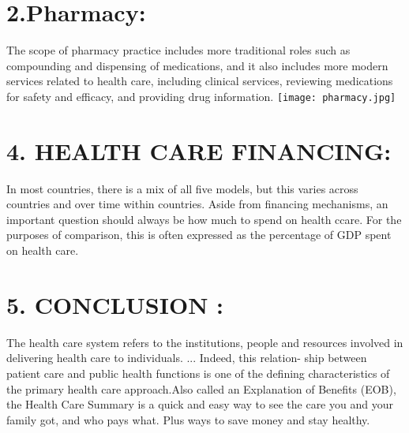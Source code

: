 \documentclass[12pt]{article}
\begin{document}
\section*{2.Pharmacy:}
The scope of pharmacy practice includes more traditional roles such as compounding and dispensing of medications, and it also includes more modern services related to health care, including clinical services, reviewing medications for safety and efficacy, and providing drug information.
\centering
\texttt{[image: pharmacy.jpg]}
\section*{4.  HEALTH CARE FINANCING:}
In most countries, there is a mix of all five models, but this varies across countries and over time within countries. Aside from financing mechanisms, an important question should always be how much to spend on health ccare. For the purposes of comparison, this is often expressed as the percentage of GDP spent on health care.
\section*{5.  CONCLUSION  :}
The health care system refers to the institutions, people and resources involved in delivering health care to individuals. ... Indeed, this relation- ship between patient care and public health functions is one of the defining characteristics of the primary health care approach.Also called an Explanation of Benefits (EOB), the Health Care Summary is a quick and easy way to see the care you and your family got, and who pays what. Plus ways to save money and stay healthy.
\end{document}

